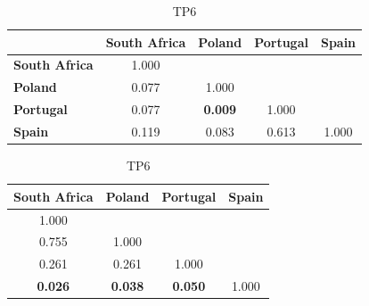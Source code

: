\begin{table}[H]
    \scriptsize
    \centering
    \setlength\tabcolsep{2pt}
    \begin{subtable}{.44\textwidth}
        \centering
        \begin{tabular}{lcccc}
            \toprule
                                  & \textbf{South Africa} & \textbf{Poland}                        & \textbf{Portugal} & \textbf{Spain} \\
            \midrule
            \textbf{South Africa} & 1.000                 &                                        &                   &                \\
            \textbf{Poland}       & 0.077                 & 1.000                                  &                   &                \\
            \textbf{Portugal}     & 0.077                 & \cellcolor[HTML]{EFEFEF}\textbf{0.009} & 1.000             &                \\
            \textbf{Spain}        & 0.119                 & 0.083                                  & 0.613             & 1.000          \\
            \bottomrule
        \end{tabular}
        \caption{TP6}
    \end{subtable}%
    \begin{subtable}{.44\textwidth}
        \centering
        \begin{tabular}{cccc}
            \toprule
            \textbf{South Africa}                  & \textbf{Poland}                        & \textbf{Portugal}                      & \textbf{Spain} \\
            \midrule
            1.000                                  &                                        &                                        &                \\
            0.755                                  & 1.000                                  &                                        &                \\
            0.261                                  & 0.261                                  & 1.000                                  &                \\
            \cellcolor[HTML]{EFEFEF}\textbf{0.026} & \cellcolor[HTML]{EFEFEF}\textbf{0.038} & \cellcolor[HTML]{EFEFEF}\textbf{0.050} & 1.000          \\
            \bottomrule
        \end{tabular}

\end{subtable}
\end{table}
